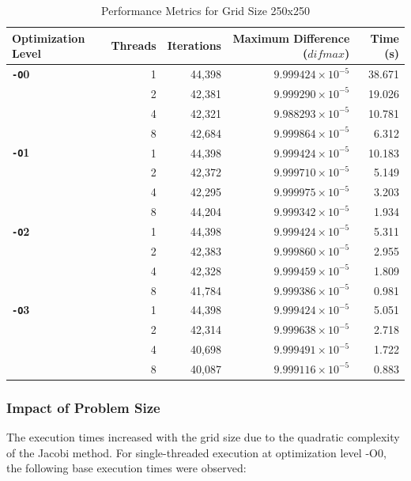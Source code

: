 \documentclass{article}
\begin{document}
\begin{table}[H]
    \centering
    \caption{Performance Metrics for Grid Size 250x250}
    \label{tab:performance_250}
    \begin{tabular}{l r r r r}
    \toprule
    \textbf{Optimization Level} & \textbf{Threads} & \textbf{Iterations} & \textbf{Maximum Difference ($difmax$)} & \textbf{Time (s)} \\
    \midrule
    \textbf{\texttt{-O}0} & 1 & 44,398 & $9.999424 \times 10^{-5}$ & 38.671 \\
        & 2 & 42,381 & $9.999290 \times 10^{-5}$ & 19.026 \\
        & 4 & 42,321 & $9.988293 \times 10^{-5}$ & 10.781 \\
        & 8 & 42,684 & $9.999864 \times 10^{-5}$ & 6.312 \\
    \midrule
    \textbf{\texttt{-O}1} & 1 & 44,398 & $9.999424 \times 10^{-5}$ & 10.183 \\
        & 2 & 42,372 & $9.999710 \times 10^{-5}$ & 5.149 \\
        & 4 & 42,295 & $9.999975 \times 10^{-5}$ & 3.203 \\
        & 8 & 44,204 & $9.999342 \times 10^{-5}$ & 1.934 \\
    \midrule
    \textbf{\texttt{-O}2} & 1 & 44,398 & $9.999424 \times 10^{-5}$ & 5.311 \\
        & 2 & 42,383 & $9.999860 \times 10^{-5}$ & 2.955 \\
        & 4 & 42,328 & $9.999459 \times 10^{-5}$ & 1.809 \\
        & 8 & 41,784 & $9.999386 \times 10^{-5}$ & 0.981 \\
    \midrule
    \textbf{\texttt{-O}3} & 1 & 44,398 & $9.999424 \times 10^{-5}$ & 5.051 \\
        & 2 & 42,314 & $9.999638 \times 10^{-5}$ & 2.718 \\
        & 4 & 40,698 & $9.999491 \times 10^{-5}$ & 1.722 \\
        & 8 & 40,087 & $9.999116 \times 10^{-5}$ & 0.883 \\
    \bottomrule
    \end{tabular}
\end{table}

\subsubsection{Impact of Problem Size}

The execution times increased with the grid size due to the quadratic complexity of the Jacobi method. For single-threaded execution at optimization level -O0, the following base execution times were observed:
\end{document}
